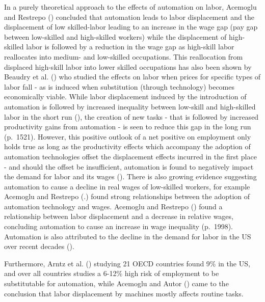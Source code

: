 \documentclass[
  12pt,
  a4paperpaper,
]{article}
\begin{document}
In a purely theoretical approach to the effects of automation on labor,
Acemoglu and Restrepo () concluded that automation leads to labor displacement and the
displacement of low skilled-labor leading to an increase in the wage gap
(pay gap between low-skilled and high-skilled workers) while the
displacement of high-skilled labor is followed by a reduction in the
wage gap as high-skill labor reallocates into medium- and low-skilled
occupations. This reallocation from displaced high-skill labor into
lower skilled occupations has also been shown by Beaudry et al.
() who studied the effects
on labor when prices for specific types of labor fall - as is induced
when substitution (through technology) becomes economically viable.
While labor displacement induced by the introduction of automation is
followed by increased inequality between low-skill and high-skilled
labor in the short run (), the creation of new tasks - that is followed
by increased productivity gains from automation - is seen to reduce this
gap in the long run (p.~1521). However, this positive outlook of a net
positive on employment only holds true as long as the productivity
effects which accompany the adoption of automation technologies offset
the displacement effects incurred in the first place - and should the
offset be insufficient, automation is found to negatively impact the
demand for labor and its wages
(). There is also growing evidence suggesting automation to cause
a decline in real wages of low-skilled workers, for example Acemoglu and
Restrepo (.) found
strong relationships between the adoption of automation technology and
wages. Acemoglu and Restrepo () found a relationship between labor displacement and a decrease
in relative wages, concluding automation to cause an increase in wage
inequality (p.~1998). Automation is also attributed to the decline in
the demand for labor in the US over recent decades
().

Furthermore, Arntz et al. ()
studying 21 OECD countries found 9\% in the US, and over all countries
studies a 6-12\% high risk of employment to be substitutable for
automation, while Acemoglu and Autor
() came to the
conclusion that labor displacement by machines mostly affects routine
tasks.
\end{document}
